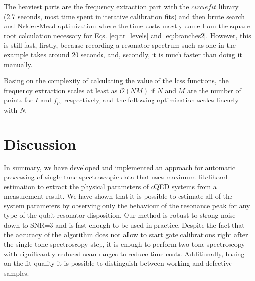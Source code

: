 \documentclass[%
 aip,
 draft,
 amsmath,amssymb,
 reprint,%
]{revtex4-1}
\begin{document}
The heaviest parts are the frequency extraction part with the $circlefit$ library (2.7 seconds, most time spent in iterative calibration fits) and then brute search and Nelder-Mead optimization where the time costs mostly come from the square root calculation necessary for Eqs. \eqref{eq:tr_levels} and \eqref{eq:branches2}. However, this is still fast, firstly, because recording a resonator spectrum such as one in the example takes around 20 seconds, and, secondly, it is much faster than doing it manually. 

Basing on the complexity of calculating the value of the loss functions, the frequency extraction scales at least as $\mathcal{O}(NM)$ if $N$ and $M$ are the number of points for $I$ and $f_p$, respectively, and the following optimization scales linearly with $N$. 


\section{Discussion}


In summary, we have developed and implemented an approach for automatic processing of single-tone spectroscopic data that uses maximum likelihood estimation to extract the physical parameters of cQED systems from a measurement result. We have shown that it is possible to estimate all of the system parameters by observing only the behaviour of the resonance peak for any type of the qubit-resonator disposition. Our method is robust to strong noise down to SNR=3 and is fast enough to be used in practice. Despite the fact that the accuracy of the algorithm does not allow to start gate calibrations right after the single-tone spectroscopy step, it is enough to perform two-tone spectroscopy with significantly reduced scan ranges to reduce time costs. Additionally, basing on the fit quality it is possible to distinguish between working and defective samples.
\end{document}
